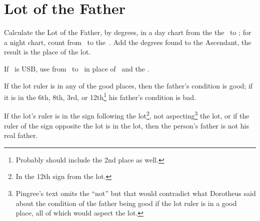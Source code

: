 \section{Lot of the Father}

Calculate the Lot of the Father, by degrees, in a day chart from the the \Sun\, to \Saturn; for a night chart, count from \Saturn\, to the \Sun\,. Add the degrees found to the Ascendant, the result is the place of the lot.

If \Saturn\, is USB, use from \Mars\, to \Jupiter\ in place of \Saturn\, and the \Sun.

If the lot ruler is in any of the good places, then the father's condition is good; if it is in the 6th, 8th, 3rd, or 12th\footnote{Probably should include the 2nd place as well.} his father's condition is bad.

If the lot's ruler is in the sign following the lot\footnote{In the 12th sign from the lot.}, not aspecting\footnote{Pingree's text omits the ``not'' but that would contradict what Dorotheus said about the condition of the father being good if the lot ruler is in a good place, all of which would aspect the lot.} the lot, or if the ruler of the sign opposite the lot is in the lot, then the person's father is not his real father.

